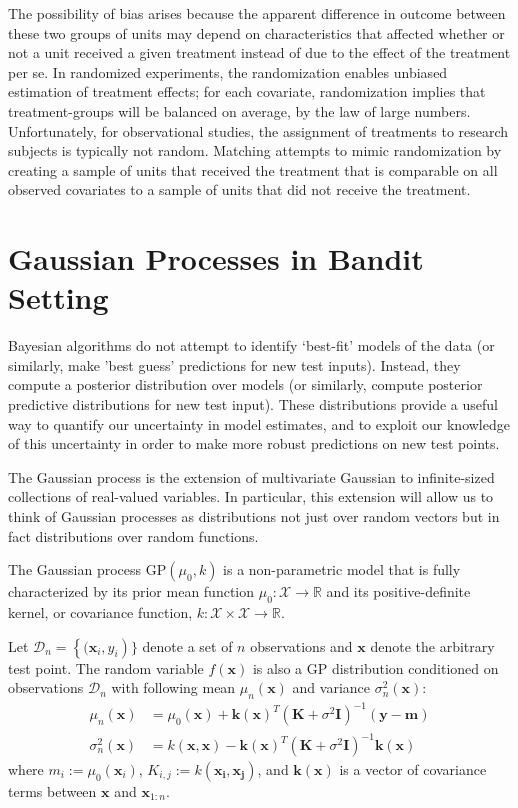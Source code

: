 \documentclass{article}
\begin{document}
The possibility of bias arises because the apparent difference in outcome between these two groups of units may depend on characteristics that affected whether or not a unit received a given treatment instead of due to the effect of the treatment per se. In randomized experiments, the randomization enables unbiased estimation of treatment effects; for each covariate, randomization implies that treatment-groups will be balanced on average, by the law of large numbers. Unfortunately, for observational studies, the assignment of treatments to research subjects is typically not random. Matching attempts to mimic randomization by creating a sample of units that received the treatment that is comparable on all observed covariates to a sample of units that did not receive the treatment.

\section{Gaussian Processes in Bandit Setting}
Bayesian algorithms do not attempt to identify ‘best-fit’ models of the data (or similarly, make 'best guess' predictions for new test inputs). Instead, they compute a posterior distribution over models (or similarly, compute posterior predictive distributions for new test input). These distributions provide a useful way to quantify our uncertainty in model estimates, and to exploit our knowledge of this uncertainty in order to make more robust predictions on new test points.

The Gaussian process is the extension of multivariate Gaussian to infinite-sized collections of real-valued variables. In particular, this extension will allow us to think of Gaussian processes as distributions not just over random vectors but in fact distributions over random functions.

The Gaussian process $\mathrm{GP}(\mu_0,k)$ is a non-parametric model
that is fully characterized by its prior mean function $\mu_0 :
\mathcal{X}\rightarrow \mathbb{R}$ and its positive-definite kernel,
or covariance function, $k: \mathcal{X} \times \mathcal{X} \rightarrow
\mathbb{R}$.

Let $\mathcal{D}_n = \left \{( \mathbf{x}_i, y_i \right )\}$ denote a
set of $n$ observations and $\mathbf{x}$ denote the arbitrary test
point. The random variable $f(\mathbf{x})$ is also a GP distribution
conditioned on observations $\mathcal{D}_n$ with following mean
$\mu_n(\mathbf{x})$ and variance $\sigma_n^2(\mathbf{x})$:
\begin{align}
 \mu_n(\mathbf{x}) &= \mu_0(\mathbf{x}) +
                     \mathbf{k}(\mathbf{x})^T(\mathbf{K}+\sigma^2\mathbf{I})^{-1}(\mathbf{y}-\mathbf{m})
  \\
  \sigma_n^2(\mathbf{x}) &= k(\mathbf{x}, \mathbf{x}) -
                           \mathbf{k}(\mathbf{x})^T(\mathbf{K}+\sigma^2\mathbf{I})^{-1}\mathbf{k}(\mathbf{x})
\end{align}
where $m_i := \mu_0(\mathbf{x}_i)$, $K_{i,j} := k(\mathbf{x_i, x_j})$,
and $\mathbf{k}(\mathbf{x})$ is a vector of covariance terms between
$\mathbf{x}$ and $\mathbf{x}_{1:n}$.
\end{document}
